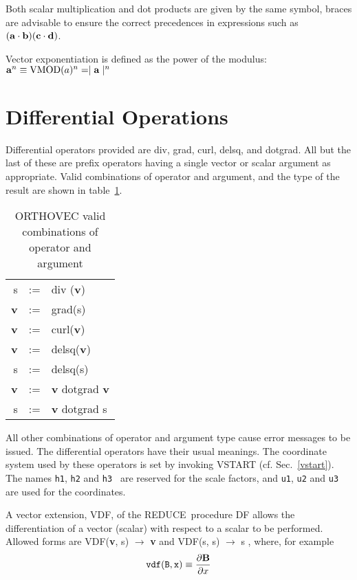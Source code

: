 \documentclass[11pt,letterpaper]{book}
\makeatletter
\newcommand{\REDUCE}{REDUCE}
\newcommand{\underscore}{\_}
\newcommand{\ttindex}[1]{{\renewcommand{\_}{\protect\underscore}%
                          \index{#1@{\tt #1}}}}
\makeatother
\begin{document}
Both scalar multiplication and dot products are given by the same symbol,
braces are advisable to ensure the correct
precedences in expressions such as $({\bf a} \cdot {\bf b})
({\bf c} \cdot {\bf d})$.

Vector exponentiation is defined as the power of the modulus:\\
${\bf a}^n \equiv  {\rm VMOD}(a)^n =   \mid {\bf a} \mid^n$

\section{Differential Operations}
Differential operators provided are div, grad, curl, delsq, and dotgrad.
All but the last of these are prefix operators having a single
vector or scalar argument as appropriate.  Valid combinations of
operator and argument, and the type of the result are shown in
table~\ref{vvecttable}.


\begin{table}
\begin{center}
\begin{tabular}{rcl}
s & := & div ({\bf v})  \\
{\bf v} & := & grad(s) \\
{\bf v} & := & curl({\bf v})  \\
{\bf v} & := & delsq({\bf v}) \\
 s  & := & delsq(s) \\
{\bf v} & := & {\bf v}  dotgrad {\bf v}  \\
 s & := & {\bf v}  dotgrad  s
\end{tabular}
\end{center}
\caption{ORTHOVEC valid combinations of operator and argument}\label{vvecttable}
\end{table}

All other combinations of operator and argument type cause error
messages to be issued.  The differential operators have their usual
meanings.  The coordinate system used by these operators is
set by invoking  VSTART (cf. Sec.~\ref{vstart}).  The names {\tt h1},
{\tt h2}  and {\tt h3 } are
reserved for the scale factors, and {\tt u1}, {\tt u2} and {\tt u3} are
used for the coordinates.

A vector extension, VDF, of the \REDUCE\ procedure DF allows the
differentiation of a vector (scalar) with respect to a scalar to be
performed.  Allowed forms are\ttindex{VDF}
VDF({\bf v}, s)  $\rightarrow$  {\bf v}   and
VDF(s, s)  $\rightarrow$   s ,
where, for example\\
\begin{eqnarray*}
{\tt vdf( B,x)} \equiv \frac{\partial {\bf B}}{\partial x}
\end{eqnarray*}
\end{document}
